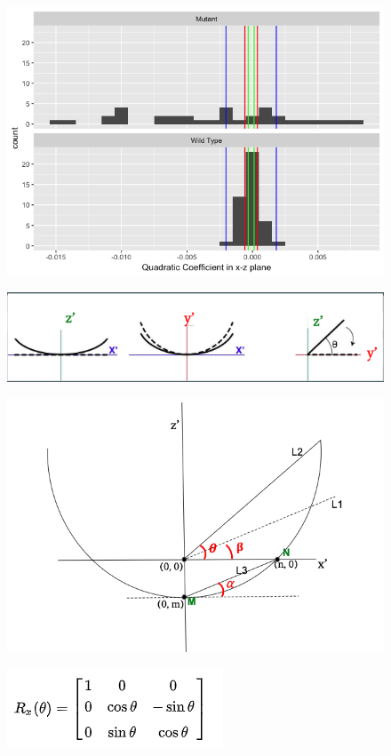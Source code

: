 \documentclass[10pt,letterpaper]{article}
\begin{document}
\begin{figure}[H]
\includegraphics[width=0.9\linewidth]{visualization_paper/range_for_is_errorB} \end{figure}

\begin{figure}[H]
\includegraphics[width=0.9\linewidth]{visualization_paper/error_correctionB} \end{figure}

\begin{figure}[H]
\includegraphics[width=0.9\linewidth]{visualization_paper/rotation_angle} \end{figure}

\begin{figure}[H]
\includegraphics[width=0.5\linewidth]{visualization_paper/rotation_matrix} \end{figure}
\end{document}
